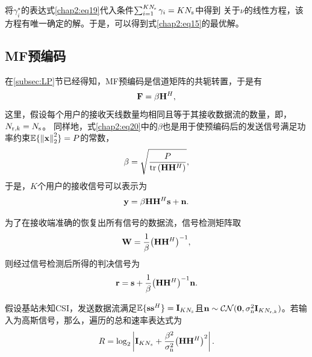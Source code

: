 将${{\gamma _i^{\star}}}$的表达式\eqref{chap2:eq19}代入条件${\sum\nolimits_{i = 1}^{K{N_{\rm{s}}}} {{\gamma _i}}  = K{N_{\rm{s}}}}$中得到
关于${\nu}$的线性方程，该方程有唯一确定的解。于是，可以得到式\eqref{chap2:eq15}的最优解。

\subsection{MF预编码}\label{subsec:MFPrecoding}
在\ref{subsec:LP}节已经得知，MF预编码是信道矩阵的共轭转置，于是有
\begin{equation}\label{chap2:eq20}
  {\bf{F}} = \beta {{\bf{H}}^H},
\end{equation}
这里，假设每个用户的接收天线数量均相同且等于其接收数据流的数量，即，${{N_{{\rm{r}},k}} = {N_{\rm{s}}}}$。 同样地，式\eqref{chap2:eq20}中的${\beta}$也是用于使预编码后的发送信号满足功率约束${\mathbb{E}\{ \left\| {\bf{x}} \right\|_2^2\}  = P}$的常数，
\begin{equation}\label{chap2:eq21}
  \beta  = \sqrt {\frac{P}{{{\rm{tr}}\left( {{\bf{H}}{{\bf{H}}^H}} \right)}}},
\end{equation}
于是，${K}$个用户的接收信号可以表示为
\begin{equation}\label{chap2:eq22}
  {\bf{y}} = \beta {\bf{H}}{{\bf{H}}^H}{\bf{s}} + {\bf{n}}.
\end{equation}

为了在接收端准确的恢复出所有信号的数据流，信号检测矩阵取
\begin{equation}\label{chap2:eq23}
  {\bf{W}} = \frac{1}{\beta }{\left( {{\bf{H}}{{\bf{H}}^H}} \right)^{ - 1}},
\end{equation}
则经过信号检测后所得的判决信号为
\begin{equation}\label{chap2:eq24}
  {\bf{r}} = {\bf{s}} + \frac{1}{\beta }{\left( {{\bf{H}}{{\bf{H}}^H}} \right)^{ - 1}}{\bf{n}}.
\end{equation}

假设基站未知CSI，发送数据流满足${\mathbb{E}\{ {\bf{s}}{{\bf{s}}^H}\}  = {{\bf{I}}_{K{N_{\rm{s}}}}}}$且${{\bf{n}} \sim \mathcal{CN}({\bf{0}},\sigma _{\rm{n}}^2{{\bf{I}}_{K{{N_{{\rm{r}},k}}}}})}$。若输入为高斯信号，那么，遍历的总和速率表达式为
\begin{equation}\label{chap2:eq25}
  R = {\log _2}\left| {{{\bf{I}}_{K{N_s}}} + \frac{{{\beta ^2}}}{{\sigma _{\rm{n}}^2}}{{\left( {{\bf{H}}{{\bf{H}}^H}} \right)}^2}} \right|.
\end{equation}

